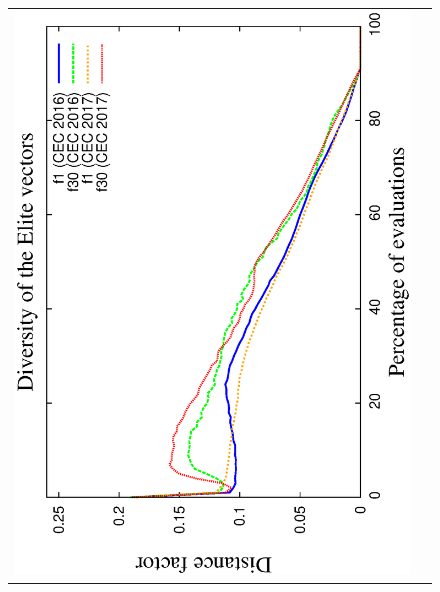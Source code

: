 \begin{figure}[t]
\centering
\begin{tabular}{cc}
   \includegraphics[scale=0.23, angle=-90]{img/ED/Diversity_Elite.eps} 

\end{tabular}
\end{figure}
